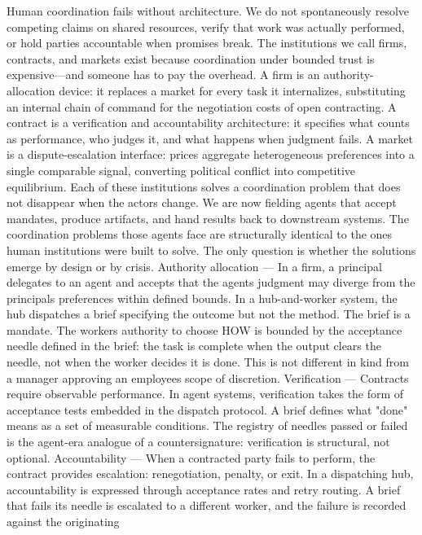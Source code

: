 \documentclass[
]{article}
\begin{document}
Human coordination fails without architecture. We do not spontaneously
resolve competing claims on shared resources, verify that work was
actually performed, or hold parties accountable when promises break. The
institutions we call firms, contracts, and markets exist because
coordination under bounded trust is expensive---and someone has to pay
the overhead. A firm is an authority-allocation device: it replaces a
market for every task it internalizes, substituting an internal chain of
command for the negotiation costs of open contracting. A contract is a
verification and accountability architecture: it specifies what counts
as performance, who judges it, and what happens when judgment fails. A
market is a dispute-escalation interface: prices aggregate heterogeneous
preferences into a single comparable signal, converting political
conflict into competitive equilibrium. Each of these institutions solves
a coordination problem that does not disappear when the actors change.
We are now fielding agents that accept mandates, produce artifacts, and
hand results back to downstream systems. The coordination problems those
agents face are structurally identical to the ones human institutions
were built to solve. The only question is whether the solutions emerge
by design or by crisis. Authority allocation --- In a firm, a principal
delegates to an agent and accepts that the agent\textquotesingle s
judgment may diverge from the principal\textquotesingle s preferences
within defined bounds. In a hub-and-worker system, the hub dispatches a
brief specifying the outcome but not the method. The brief is a mandate.
The worker\textquotesingle s authority to choose HOW is bounded by the
acceptance needle defined in the brief: the task is complete when the
output clears the needle, not when the worker decides it is done. This
is not different in kind from a manager approving an
employee\textquotesingle s scope of discretion. Verification ---
Contracts require observable performance. In agent systems, verification
takes the form of acceptance tests embedded in the dispatch protocol. A
brief defines what "done" means as a set of measurable conditions. The
registry of needles passed or failed is the agent-era analogue of a
countersignature: verification is structural, not optional.
Accountability --- When a contracted party fails to perform, the
contract provides escalation: renegotiation, penalty, or exit. In a
dispatching hub, accountability is expressed through acceptance rates
and retry routing. A brief that fails its needle is escalated to a
different worker, and the failure is recorded against the originating
\end{document}
